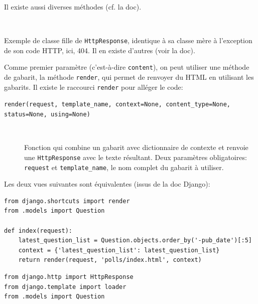 \documentclass[a4paper, 10pt]{article}
\begin{document}
{\begin{description}
    Il existe aussi diverses méthodes (cf. la doc).

    \item[\texttt{class HttpResponseNotFound(HttpResponse)}]~

    Exemple de classe fille de \texttt{HttpResponse}, identique à sa classe mère à l'exception de son code HTTP, ici, 404. Il en existe d'autres (voir la doc).
\end{description}

Comme  premier paramètre (c'est-à-dire \texttt{content}), on peut utiliser une méthode de gabarit, la méthode \texttt{render}, qui permet de renvoyer du HTML en utilisant les gabarits. Il existe le raccourci \texttt{render} pour alléger le code:

\begin{description}
    \item[\texttt{render(request, template_name, context=None, content_type=None, status=None, using=None)}]~

    Fonction qui combine un gabarit avec dictionnaire de contexte et renvoie une \texttt{HttpResponse} avec le texte résultant. Deux paramètres obligatoires: \texttt{request} et \texttt{template\_name}, le nom complet du gabarit à utiliser.
\end{description}

Les deux vues suivantes sont équivalentes (issus de la doc
 Django):
\begin{verbatim}
from django.shortcuts import render
from .models import Question

def index(request):
    latest_question_list = Question.objects.order_by('-pub_date')[:5]
    context = {'latest_question_list': latest_question_list}
    return render(request, 'polls/index.html', context)
\end{verbatim}

\begin{verbatim}
from django.http import HttpResponse
from django.template import loader
from .models import Question


\end{verbatim}}
\end{document}
